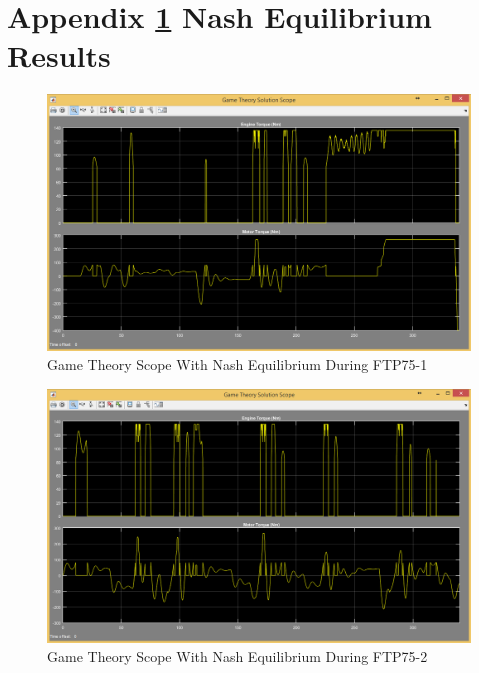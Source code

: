 \appendix
\chapter{Appendix \ref{app:1} Nash Equilibrium Results}
\label{app:1}


\begin{figure}[h]
\centering
\includegraphics[scale=0.47]{figures/NashEquilibrium/FTP75-1/gameTheory13Juni}
\caption{Game Theory Scope With Nash Equilibrium During FTP75-1}
\label{fig:gtne1}
\end{figure}



\begin{figure}[h]
\centering
\includegraphics[scale=0.47]{figures/NashEquilibrium/FTP75-2/gameTheory13Juni}
\caption{Game Theory Scope With Nash Equilibrium During FTP75-2}
\label{fig:gtne2}
\end{figure}



